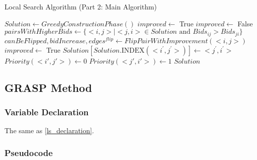 \documentclass{article}
\begin{document}
\begin{algorithm}[H]
\renewcommand{\thealgorithm}{}
\caption{Local Search Algorithm (Part 2: Main Algorithm)}
\begin{algorithmic}

\State $Solution \gets GreedyConstructionPhase()$
\State $improved \gets$ True
    \State $improved \gets$ False
    \State $pairsWithHigherBids \gets \{<i,j> \mid <j,i> \in Solution \textrm{ and } Bids_{ij} > Bids_{ji}\}$
        \State $canBeFlipped, bidIncrease, edges^{flip} \gets FlipPairWithImprovement(<i,j>)$
            \State $improved \gets$ True
                \State $Solution[Solution.\textrm{INDEX}(<i^{'}, j^{'}>)] \gets <j^{'}, i^{'}>$
                \State $Priority(<i',j'>) \gets 0$
                \State $Priority(<j',i'>) \gets 1$
            \EndFor
        \EndIf
    \EndFor
\EndWhile
\State \Return $Solution$

\end{algorithmic}
\end{algorithm}


\subsection{GRASP Method}
\subsubsection{Variable Declaration}
The same as \ref{ls_declaration}.

\subsubsection{Pseudocode}
\end{document}
